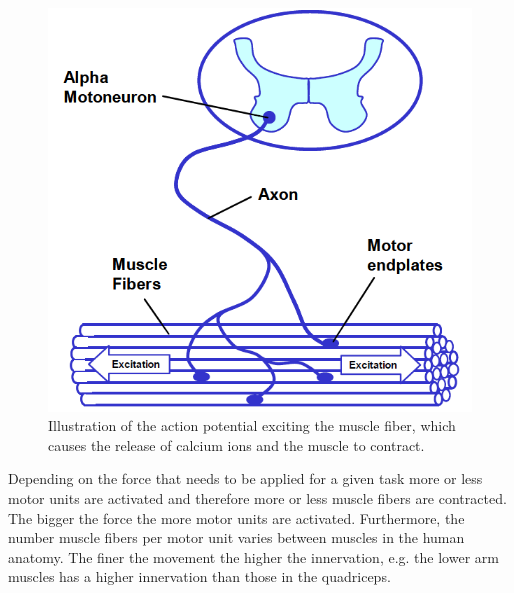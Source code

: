 \begin{figure}[H]
	\includegraphics[width=.4\textwidth]{figures/Anatomy/EMG_generation}  %
	\caption{Illustration of the action potential exciting the muscle fiber, which causes the release of calcium ions and the muscle to contract. \cite{konrad2005}}
	\label{fig:EMG_generation}  %
\end{figure}

Depending on the force that needs to be applied for a given task more or less motor units are activated and therefore more or less muscle fibers are contracted. The bigger the force the more motor units are activated. Furthermore, the number muscle fibers per motor unit varies between muscles in the human anatomy. The finer the movement the higher the innervation, e.g. the lower arm muscles has a higher innervation than those in the quadriceps. \cite{cram2012}



